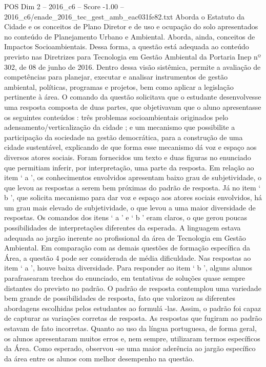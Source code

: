 \begin{textsample}{POS Dim 2 – 2016\_c6 – Score -1.00 – 2016\_c6/enade\_2016\_tec\_gest\_amb\_eac031fe82.txt}
Aborda o Estatuto da Cidade e os conceitos de Plano Diretor e de uso e ocupação do solo apresentados no conteúdo de Planejamento Urbano e Ambiental.
Aborda, ainda, conceitos de Impactos Socioambientais.
Dessa forma, a questão está adequada ao conteúdo previsto nas Diretrizes para Tecnologia em Gestão Ambiental da Portaria Inep nº 302, de 08 de junho de 2016.
Dentro dessa visão sistêmica, permite a avaliação de competências para planejar, executar e analisar instrumentos de gestão ambiental, políticas, programas e projetos, bem como aplicar a legislação pertinente à área.
O comando da questão solicitava que o estudante desenvolvesse uma resposta composta de duas partes, que objetivavam que o aluno apresentasse os seguintes conteúdos : três problemas socioambientais originados pelo adensamento/verticalização da cidade ; e um mecanismo que possibilite a participação da sociedade na gestão democrática, para a construção de uma cidade sustentável, explicando de que forma esse mecanismo dá voz e espaço aos diversos atores sociais.
Foram fornecidos um texto e duas figuras no enunciado que permitiam inferir, por interpretação, uma parte da resposta.
Em relação ao item ‘ a ’, os conhecimentos envolvidos apresentam baixo grau de subjetividade, o que levou as respostas a serem bem próximas do padrão de resposta.
Já no item ‘ b ’, que solicita mecanismo para dar voz e espaço aos atores sociais envolvidos, há um grau mais elevado de subjetividade, o que levou a uma maior diversidade de respostas.
Os comandos dos itens ‘ a ’ e ‘ b ’ eram claros, o que gerou poucas possibilidades de interpretações diferentes da esperada.
A linguagem estava adequada ao jargão inerente ao profissional da área de Tecnologia em Gestão Ambiental.
Em comparação com as demais questões de formação específica da Área, a questão 4 pode ser considerada de média dificuldade.
Nas respostas ao item ‘ a ’, houve baixa diversidade.
Para responder ao item ‘ b ’, alguns alunos parafrasearam trechos do enunciado, em tentativas de soluções quase sempre distantes do previsto no padrão.
O padrão de resposta contemplou uma variedade bem grande de possibilidades de resposta, fato que valorizou as diferentes abordagens escolhidas pelos estudantes ao formulá -las.
Assim, o padrão foi capaz de capturar as variações corretas de resposta.
As respostas que fugiram ao padrão estavam de fato incorretas.
Quanto ao uso da língua portuguesa, de forma geral, os alunos apresentaram muitos erros e, nem sempre, utilizaram termos específicos da Área.
Como esperado, observou -se uma maior aderência ao jargão específico da área entre os alunos com melhor desempenho na questão.

\end{textsample}
